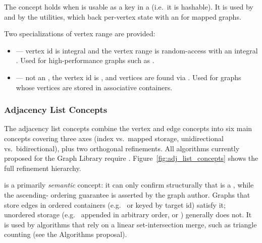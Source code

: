 The  concept holds when  is usable as a key in a
 (i.e.\ it is hashable). It is used by  and by the
 utilities, which back per-vertex state with an  for mapped graphs.

Two specializations of vertex range are provided:
\begin{itemize}
    \item {} — vertex id is integral and the vertex range is random-access with an integral . Used for high-performance graphs such as .
    \item {} — not an , the vertex id is , and vertices are found via . Used for graphs whose vertices are stored in associative containers.
\end{itemize}


{\small
     
}

\subsubsection{Adjacency List Concepts}
The adjacency list concepts combine the vertex and edge concepts into six main concepts
covering three axes (index vs.\ mapped storage, unidirectional vs.\ bidirectional), plus
two orthogonal refinements. All algorithms currently proposed for the Graph Library
require . Figure~\ref{fig:adj_list_concepts} shows the
full refinement hierarchy.

 is a primarily \emph{semantic} concept: it can only
confirm structurally that  is a , while the
ascending- ordering guarantee is asserted by the graph author. Graphs
that store edges in ordered containers (e.g.\  or  keyed by target
id) satisfy it; unordered storage (e.g.\  appended in arbitrary order, or
) generally does not. It is used by algorithms that rely on a
linear set-intersection merge, such as triangle counting (see the Algorithms proposal).

